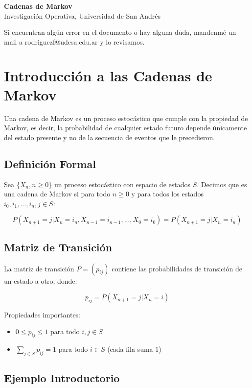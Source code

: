 \documentclass[a4paper,11pt]{article}
\begin{document}
\begin{center}
    {\LARGE \textbf{Cadenas de Markov}}\\[0.5em]
    {Investigación Operativa, Universidad de San Andrés}
\end{center}

Si encuentran algún error en el documento o hay alguna duda, mandenmé un mail a rodriguezf@udesa.edu.ar y lo revisamos.

\section{Introducción a las Cadenas de Markov}

Una cadena de Markov es un proceso estocástico que cumple con la propiedad de Markov, es decir, la probabilidad de cualquier estado futuro depende únicamente del estado presente y no de la secuencia de eventos que le precedieron.

\subsection{Definición Formal}

Sea $\{X_n, n \geq 0\}$ un proceso estocástico con espacio de estados $S$. Decimos que es una cadena de Markov si para todo $n \geq 0$ y para todos los estados $i_0, i_1, ..., i_n, j \in S$:

\[
P(X_{n+1} = j | X_n = i_n, X_{n-1} = i_{n-1}, ..., X_0 = i_0) = P(X_{n+1} = j | X_n = i_n)
\]

\subsection{Matriz de Transición}

La matriz de transición $P = (p_{ij})$ contiene las probabilidades de transición de un estado a otro, donde:

\[p_{ij} = P(X_{n+1} = j | X_n = i)\]

Propiedades importantes:
\begin{itemize}
    \item $0 \leq p_{ij} \leq 1$ para todo $i,j \in S$
    \item $\sum_{j \in S} p_{ij} = 1$ para todo $i \in S$ (cada fila suma 1)
\end{itemize}

\subsection{Ejemplo Introductorio}
\end{document}
